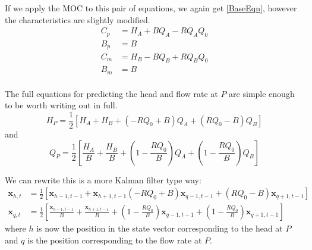 \documentclass[]{article}
\begin{document}
If we apply the MOC to this pair of equations, we again get \eqref{BaseEqn}, however the characteristics are slightly modified.
\begin{equation}
 \begin{split}
  C_p &= H_A +  B Q_A - R Q_A Q_0 \\
  B_p &= B \\
  C_m &= H_B - B Q_B + R Q_B Q_0\\
  B_m &= B  \\ 
 \end{split}
\end{equation}

The full equations for predicting the head and flow rate at $P$ are simple enough to be worth writing out in full.
\begin{equation}\label{LinearH}
 H_P = \frac{1}{2} \left[H_A +  H_B + \left(-R Q_0 + B \right)Q_A + \left(R Q_0 - B\right) Q_B \right]
\end{equation}
and
\begin{equation}\label{LinearQ}
 Q_P = \frac{1}{2} \left[\frac{H_A}{B} + \frac{H_B}{B} + \left(1-\frac{R Q_0}{B} \right)Q_A + \left(1-\frac{R Q_0}{B}\right)Q_B    \right]
\end{equation}

We can rewrite this is a more Kalman filter type way:
\begin{equation}
\begin{split}
 \mathbf{x}_{h,t} &= \frac{1}{2} \left[ \mathbf{x}_{h-1,t-1} +   \mathbf{x}_{h+1,t-1} \left(-R Q_0 + B \right) \mathbf{x}_{q-1,t-1} + \left(R Q_0 - B\right)  \mathbf{x}_{q+1,t-1} \right]\\
  \mathbf{x}_{q,t} &= \frac{1}{2} \left[\frac{\mathbf{x}_{h-1,t-1}}{B} + \frac{\mathbf{x}_{h+1,t-1}}{B} + \left(1-\frac{R Q_0}{B} \right)\mathbf{x}_{q-1,t-1} + \left(1-\frac{R Q_0}{B}\right)\mathbf{x}_{q+1,t-1}    \right]
 \end{split}
\end{equation}
where $h$ is now the position in the state vector corresponding to the head at $P$ and $q$ is the position corresponding to the flow rate at $P$.
\end{document}
